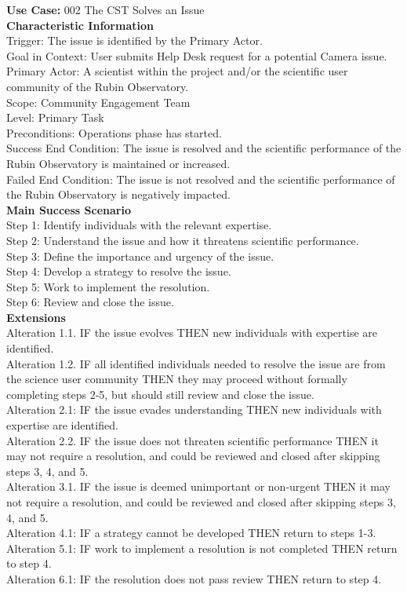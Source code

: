 {\bf Use Case:} 002 The CST Solves an Issue \\

{\bf Characteristic Information} \\
Trigger: The issue is identified by the Primary Actor. \\
Goal in Context: User submits Help Desk request for a potential Camera issue. \\
Primary Actor: A scientist within the project and/or the scientific user community of the Rubin Observatory. \\
Scope: Community Engagement Team \\
Level: Primary Task \\
Preconditions: Operations phase has started. \\
Success End Condition: The issue is resolved and the scientific performance of the Rubin Observatory is maintained or increased. \\
Failed End Condition: The issue is not resolved and the scientific performance of the Rubin Observatory is negatively impacted. \\

{\bf Main Success Scenario} \\
Step 1: Identify individuals with the relevant expertise.\\
Step 2: Understand the issue and how it threatens scientific performance.\\
Step 3: Define the importance and urgency of the issue.\\
Step 4: Develop a strategy to resolve the issue.\\
Step 5: Work to implement the resolution.\\
Step 6: Review and close the issue.\\

{\bf Extensions} \\
Alteration 1.1. IF  the issue evolves THEN new individuals with expertise are identified.\\
Alteration 1.2. IF  all identified individuals needed to resolve the issue are from the science user community THEN they may proceed without formally completing steps 2-5, but should still review and close the issue.\\
Alteration 2.1: IF the issue evades understanding THEN new individuals with expertise are identified.\\
Alteration 2.2. IF the issue does not threaten scientific performance THEN it may not require a resolution, and could be reviewed and closed after skipping steps 3, 4, and 5.\\
Alteration 3.1. IF the issue is deemed unimportant or non-urgent THEN it may not require a resolution, and could be reviewed and closed after skipping steps 3, 4, and 5.\\
Alteration 4.1: IF a strategy cannot be developed THEN return to steps 1-3.\\
Alteration 5.1: IF work to implement a resolution is not completed THEN return to step 4.\\
Alteration 6.1: IF the resolution does not pass review THEN return to step 4.\\

